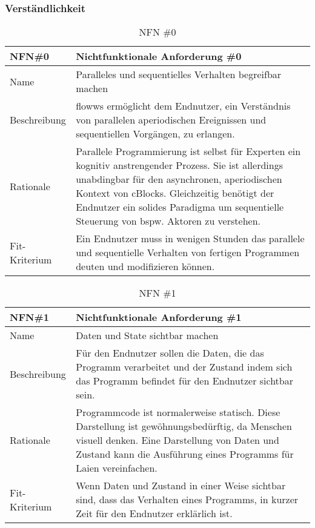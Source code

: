 \subsubsection{Verständlichkeit}
\begin{table}[H]
\caption{NFN \#0}
\label{tab:nfn0}
\begin{tabularx}{\textwidth}{lX}
\hline
\rowcolor[HTML]{EFEFEF} 
NFN\#0        & Nichtfunktionale Anforderung \#0 \\ \hline
Name          & Paralleles und sequentielles Verhalten begreifbar machen \\ \hline
Beschreibung  & flowws ermöglicht dem Endnutzer, ein Verständnis von parallelen aperiodischen Ereignissen und sequentiellen Vorgängen, zu erlangen. \\ \hline
Rationale     & Parallele Programmierung ist selbst für Experten ein kognitiv anstrengender Prozess. Sie ist allerdings unabdingbar für den asynchronen, aperiodischen Kontext von cBlocks. Gleichzeitig benötigt der Endnutzer ein solides Paradigma um sequentielle Steuerung von bspw. Aktoren zu verstehen. \\ \hline
Fit-Kriterium & Ein Endnutzer muss in wenigen Stunden das parallele und sequentielle Verhalten von fertigen Programmen deuten und modifizieren können.\\ \hline
\end{tabularx}
\end{table}


\begin{table}[H]
\caption{NFN \#1}
\label{tab:nfn1}
\begin{tabularx}{\textwidth}{lX}
\hline
\rowcolor[HTML]{EFEFEF} 
NFN\#1        & Nichtfunktionale Anforderung \#1 \\ \hline
Name          & Daten und State sichtbar machen \\ \hline
Beschreibung  & Für den Endnutzer sollen die Daten, die das Programm verarbeitet und der Zustand indem sich das Programm befindet für den Endnutzer sichtbar sein. \\ \hline
Rationale     & Programmcode ist normalerweise statisch. Diese Darstellung ist gewöhnungsbedürftig, da Menschen visuell denken. Eine Darstellung von Daten und Zustand kann die Ausführung eines Programms für Laien vereinfachen. \\ \hline
Fit-Kriterium & Wenn Daten und Zustand in einer Weise sichtbar sind, dass das Verhalten eines Programms, in kurzer Zeit für den Endnutzer erklärlich ist. \\ \hline
\end{tabularx}
\end{table}

